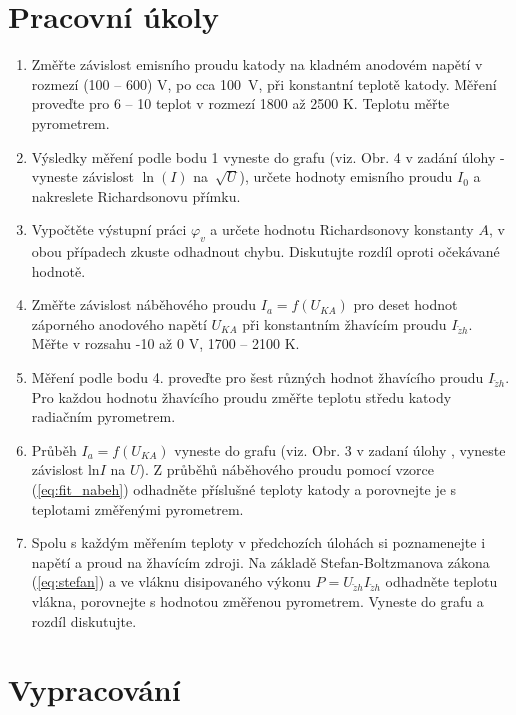 \documentclass[english]{article}
\begin{document}


\setlength{\parindent}{0.5cm}
\section{Pracovní úkoly}
\begin{enumerate}
  \item Změřte závislost emisního proudu katody na kladném anodovém napětí
    v rozmezí (100 -- 600) V, po cca 100~V, při konstantní teplotě katody.
    Měření proveďte pro 6 -- 10 teplot v rozmezí 1800 až 2500 K. Teplotu
    měřte pyrometrem.
  \item Výsledky měření podle bodu 1 vyneste do grafu (viz. Obr. 4
    v zadání úlohy \cite{bib:zadani} - vyneste závislost $\ln(I)$ na~$\sqrt{U}$),
    určete hodnoty emisního proudu $I_0$ a nakreslete Richardsonovu přímku.
  \item Vypočtěte výstupní práci $\varphi_v$ a určete hodnotu Richardsonovy
    konstanty $A$, v obou případech zkuste odhadnout chybu. Diskutujte 
    rozdíl oproti očekávané hodnotě.
  \item Změřte závislost náběhového proudu $I_a=f(U_{KA})$ pro deset 
    hodnot záporného anodového napětí $U_{KA}$ při konstantním žhavícím
    proudu $I_{\check{z}h}$. Měřte v rozsahu -10 až 0 V, 1700 -- 2100 K.
  \item Měření podle bodu 4. proveďte pro šest různých hodnot žhavícího 
    proudu $I_{\check{z}h}$. Pro každou hodnotu žhavícího proudu změřte teplotu 
    středu katody radiačním pyrometrem.
  \item Průběh $I_a=f(U_{KA})$ vyneste do grafu (viz. Obr. 3 v zadaní
    úlohy \cite{bib:zadani}, vyneste závislost ln$I$ na $U$). Z průběhů
    náběhového proudu pomocí vzorce (\ref{eq:fit_nabeh}) odhadněte 
    příslušné teploty katody a porovnejte je s teplotami změřenými pyrometrem.
  \item Spolu s každým měřením teploty v předchozích úlohách si poznamenejte
    i napětí a proud na žhavícím zdroji. Na základě Stefan-Boltzmanova zákona
    (\ref{eq:stefan}) a ve vláknu disipovaného výkonu $P=U_{\check{z}h}I_{\check{z}h}$ 
    odhadněte teplotu vlákna, porovnejte s hodnotou změřenou pyrometrem. 
    Vyneste do grafu a rozdíl diskutujte.
\end{enumerate}

\section{Vypracování}
\end{document}
